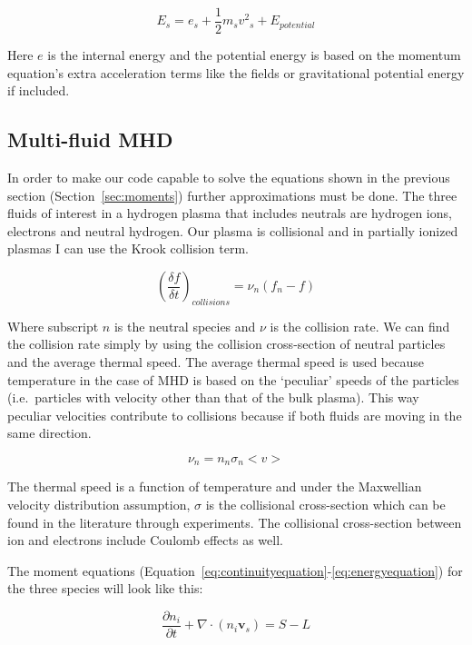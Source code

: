 \documentclass[12pt,upcase]{umlthesis}
\begin{document}
\begin{equation}\label{eq:energy}
	E_s = e_s + \frac{1}{2} m_s {v^2}_s + E_{potential}
\end{equation}

Here $e$ is the internal energy and the potential energy is based on the momentum equation's extra acceleration terms like the fields or gravitational potential energy if included.

\subsection{Multi-fluid MHD}\label{sec:multifluidmhd}

In order to make our code capable to solve the equations shown in the previous section (Section~\ref{sec:moments}) further approximations must be done. The three fluids of interest in a hydrogen plasma that includes neutrals are hydrogen ions, electrons and neutral hydrogen. Our plasma is collisional and in partially ionized plasmas I can use the Krook collision term.

\begin{equation}\label{eq:krook}
	{(\frac{\delta f}{\delta t})}_{collisions} = \nu_n (f_n - f)
\end{equation}

Where subscript $n$ is the neutral species and $\nu$ is the collision rate. We can find the collision rate simply by using the collision cross-section of neutral particles and the average thermal speed. The average thermal speed is used because temperature in the case of MHD is based on the `peculiar' speeds of the particles (i.e.\ particles with velocity other than that of the bulk plasma). This way peculiar velocities contribute to collisions because if both fluids are moving in the same direction.

\begin{equation}\label{eq:collisionrate}
	\nu_n = n_n \sigma_n <v>
\end{equation}

The thermal speed is a function of temperature and under the Maxwellian velocity distribution assumption, $\sigma$ is the collisional cross-section which can be found in the literature through experiments. The collisional cross-section between ion and electrons include Coulomb effects as well.

The moment equations (Equation~\ref{eq:continuityequation}-\ref{eq:energyequation}) for the three species will look like this:

\begin{equation}\label{eq:icontinuity}
	\frac{\partial n_i}{\partial t} + \nabla \cdot (n_i \textbf{v}_s) = S - L
\end{equation}
\end{document}
